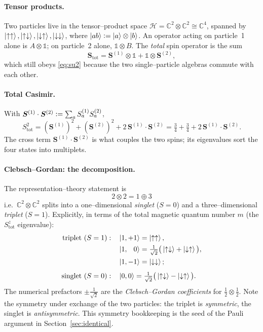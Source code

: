 \documentclass[11pt,oneside]{article}
\newcommand{\C}{\mathbb{C}}
\newcommand{\id}{\mathbb{1}}
\newcommand{\eqdef}{\vcentcolon=}
\newcommand{\up}{\uparrow}
\newcommand{\down}{\downarrow}
\begin{document}
\paragraph{Tensor products.}
Two particles live in the tensor--product space
$\mathcal H = \C^2\otimes\C^2 \cong \C^4$, spanned by
$\ket{\up\up},\ket{\up\down},\ket{\down\up},\ket{\down\down}$, where
$\ket{ab}\eqdef\ket a\otimes\ket b$. An operator acting on particle~1 alone is
$A\otimes\id$; on particle~2 alone, $\id\otimes B$. The \emph{total} spin
operator is the sum
\begin{equation}
  \bm S_{\mathrm{tot}} = \bm S^{(1)}\otimes\id + \id\otimes\bm S^{(2)},
\end{equation}
which still obeys \eqref{eq:su2} because the two single--particle algebras
commute with each other.

\paragraph{Total Casimir.}
With $\bm S^{(1)}\cdot\bm S^{(2)} \eqdef \sum_a S^{(1)}_a S^{(2)}_a$,
\begin{equation}
  S_{\mathrm{tot}}^2
  = (\bm S^{(1)})^2 + (\bm S^{(2)})^2 + 2\,\bm S^{(1)}\!\cdot\bm S^{(2)}
  = \tfrac34 + \tfrac34 + 2\,\bm S^{(1)}\!\cdot\bm S^{(2)}.
  \label{eq:twocasimir}
\end{equation}
The cross term $\bm S^{(1)}\!\cdot\bm S^{(2)}$ is what couples the two spins;
its eigenvalues sort the four states into multiplets.

\paragraph{Clebsch--Gordan: the decomposition.}
The representation--theory statement is
\begin{equation}
  \boxed{\,2\otimes 2 = 1 \oplus 3\,}
\end{equation}
i.e.\ $\C^2\otimes\C^2$ splits into a one--dimensional \emph{singlet} ($S=0$)
and a three--dimensional \emph{triplet} ($S=1$). Explicitly, in terms of the
total magnetic quantum number $m$ (the $S^z_{\mathrm{tot}}$ eigenvalue):
\begin{align}
  \text{triplet } (S=1):\quad
    & \ket{1,+1} = \ket{\up\up}, \notag\\
    & \ket{1,\phantom{+}0} = \tfrac{1}{\sqrt2}\big(\ket{\up\down}+\ket{\down\up}\big),
        \label{eq:triplet}\\
    & \ket{1,-1} = \ket{\down\down}; \notag\\[4pt]
  \text{singlet } (S=0):\quad
    & \ket{0,0} = \tfrac{1}{\sqrt2}\big(\ket{\up\down}-\ket{\down\up}\big).
        \label{eq:singlet}
\end{align}
The numerical prefactors $\pm\tfrac{1}{\sqrt2}$ are the \emph{Clebsch--Gordan
coefficients} for $\tfrac12\otimes\tfrac12$. Note the symmetry under exchange of
the two particles: the triplet is \emph{symmetric}, the singlet is
\emph{antisymmetric}. This symmetry bookkeeping is the seed of the Pauli
argument in Section~\ref{sec:identical}.
\end{document}
